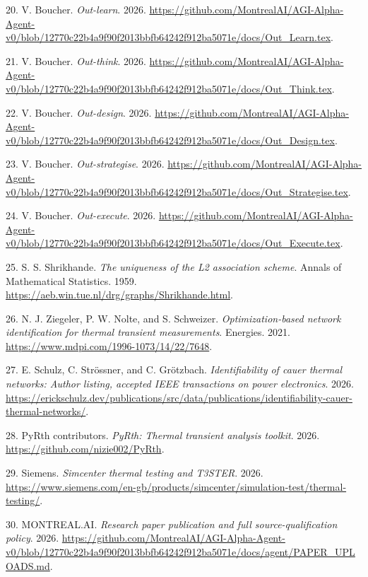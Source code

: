 \documentclass[
  11pt,
]{article}
\newlength{\cslhangindent}
\newlength{\cslentryspacingunit} %
\newenvironment{CSLReferences}[2] %
 {%
  \setlength{\parindent}{0pt}
  \ifodd #1
  \let\oldpar\par
  \def\par{\hangindent=\cslhangindent\oldpar}
  \fi
  \setlength{\parskip}{#2\cslentryspacingunit}
 }%
 {}
\begin{document}
\begin{CSLReferences}{1}{1}
\leavevmode{}%
20. V. Boucher. \emph{Out-learn}. 2026.
\url{https://github.com/MontrealAI/AGI-Alpha-Agent-v0/blob/12770c22b4a9f90f2013bbfb64242f912ba5071e/docs/Out_Learn.tex}.

\leavevmode{}%
21. V. Boucher. \emph{Out-think}. 2026.
\url{https://github.com/MontrealAI/AGI-Alpha-Agent-v0/blob/12770c22b4a9f90f2013bbfb64242f912ba5071e/docs/Out_Think.tex}.

\leavevmode{}%
22. V. Boucher. \emph{Out-design}. 2026.
\url{https://github.com/MontrealAI/AGI-Alpha-Agent-v0/blob/12770c22b4a9f90f2013bbfb64242f912ba5071e/docs/Out_Design.tex}.

\leavevmode{}%
23. V. Boucher. \emph{Out-strategise}. 2026.
\url{https://github.com/MontrealAI/AGI-Alpha-Agent-v0/blob/12770c22b4a9f90f2013bbfb64242f912ba5071e/docs/Out_Strategise.tex}.

\leavevmode{}%
24. V. Boucher. \emph{Out-execute}. 2026.
\url{https://github.com/MontrealAI/AGI-Alpha-Agent-v0/blob/12770c22b4a9f90f2013bbfb64242f912ba5071e/docs/Out_Execute.tex}.

\leavevmode{}%
25. S. S. Shrikhande. \emph{The uniqueness of the L2 association
scheme}. Annals of Mathematical Statistics. 1959.
\url{https://aeb.win.tue.nl/drg/graphs/Shrikhande.html}.

\leavevmode{}%
26. N. J. Ziegeler, P. W. Nolte, and S. Schweizer.
\emph{Optimization-based network identification for thermal transient
measurements}. Energies. 2021.
\url{https://www.mdpi.com/1996-1073/14/22/7648}.

\leavevmode{}%
27. E. Schulz, C. Strössner, and C. Grötzbach. \emph{Identifiability of
cauer thermal networks: Author listing, accepted IEEE transactions on
power electronics}. 2026.
\url{https://erickschulz.dev/publications/src/data/publications/identifiability-cauer-thermal-networks/}.

\leavevmode{}%
28. PyRth contributors. \emph{PyRth: Thermal transient analysis
toolkit}. 2026. \url{https://github.com/nizie002/PyRth}.

\leavevmode{}%
29. Siemens. \emph{Simcenter thermal testing and T3STER}. 2026.
\url{https://www.siemens.com/en-gb/products/simcenter/simulation-test/thermal-testing/}.

\leavevmode{}%
30. MONTREAL.AI. \emph{Research paper publication and full
source-qualification policy}. 2026.
\url{https://github.com/MontrealAI/AGI-Alpha-Agent-v0/blob/12770c22b4a9f90f2013bbfb64242f912ba5071e/docs/agent/PAPER_UPLOADS.md}.

\end{CSLReferences}
\end{document}
